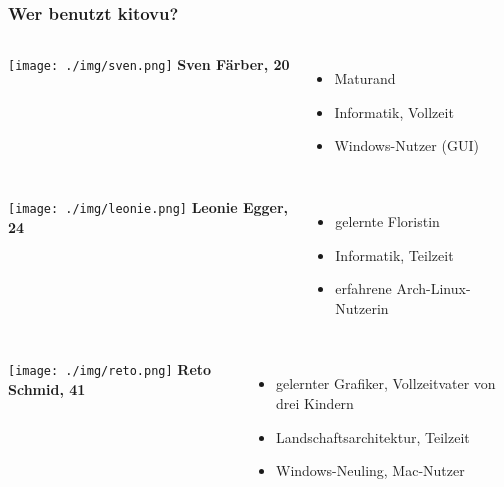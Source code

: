 \documentclass{beamer}
\begin{document}
	\begin{frame}
 	\frametitle{Wer benutzt kitovu?}
	 	\begin{columns}
	 		\texttt{[image: ./img/sven.png]}
			\textbf{Sven Färber, 20}
			\begin{itemize}
				\item Maturand
				\item Informatik, Vollzeit
				\item Windows-Nutzer (GUI)
			\end{itemize}
	 	\end{columns} \vspace{1em}
	 	\pause
		\begin{columns}
			\column{.2\textwidth}
			\texttt{[image: ./img/leonie.png]}
			\column{.8\textwidth}
			\textbf{Leonie Egger, 24}
			\begin{itemize}
				\item gelernte Floristin
				\item Informatik, Teilzeit
				\item erfahrene Arch-Linux-Nutzerin
			\end{itemize}
		\end{columns} \vspace{1em}
		\pause
		\begin{columns}
			\texttt{[image: ./img/reto.png]}
			\textbf{Reto Schmid, 41}
		\begin{itemize}
			\item gelernter Grafiker, Vollzeitvater von drei Kindern
			\item Landschaftsarchitektur, Teilzeit
			\item Windows-Neuling, Mac-Nutzer
		\end{itemize}
		\end{columns}
	\end{frame}
	
\end{document}

